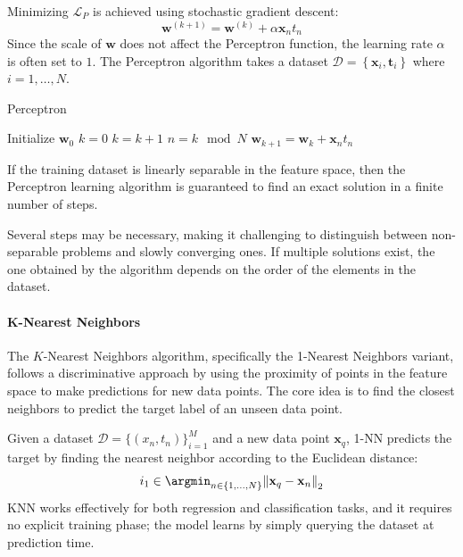 Minimizing $\mathcal{L}_P$ is achieved using stochastic gradient descent:
\[\textbf{w}^{(k+1)}=\textbf{w}^{(k)}+\alpha\textbf{x}_nt_n\]
Since the scale of $\textbf{w}$ does not affect the Perceptron function, the learning rate $\alpha$ is often set to $1$. 
The Perceptron algorithm takes a dataset $\mathcal{D}=\left\{ \textbf{x}_i,\textbf{t}_i  \right\}$ where $i=1,\dots,N$. 
\begin{algorithm}[H]
    \caption{Perceptron}
        \begin{algorithmic}[1]
            \State Initialize $\textbf{w}_0$
            \State $k = 0$
            \Repeat
                \State $k = k+1$
                \State $n = k \mod N$
                    \State $\textbf{w}_{k+1} = \textbf{w}_k + \textbf{x}_nt_n$
                \EndIf
        \end{algorithmic}
\end{algorithm}
\begin{theorem}
    If the training dataset is linearly separable in the feature space, then the Perceptron learning algorithm is guaranteed to find an exact solution in a finite number of steps.
\end{theorem}
Several steps may be necessary, making it challenging to distinguish between non-separable problems and slowly converging ones. 
If multiple solutions exist, the one obtained by the algorithm depends on the order of the elements in the dataset.

\paragraph*{K-Nearest Neighbors}
The $K$-Nearest Neighbors algorithm, specifically the 1-Nearest Neighbors variant, follows a discriminative approach by using the proximity of points in the feature space to make predictions for new data points. 
The core idea is to find the closest neighbors to predict the target label of an unseen data point.

Given a dataset $\mathcal{D}=\{(x_n,t_n)\}_{i=1}^M$ and a new data point $\mathbf{x}_q$, 1-NN predicts the target by finding the nearest neighbor according to the Euclidean distance:
\[i_1\in\argmin_{n\in\{1,\dots,N\}}{\left\lVert \mathbf{x}_q- \mathbf{x}_n\right\rVert}_2 \]
KNN works effectively for both regression and classification tasks, and it requires no explicit training phase; the model learns by simply querying the dataset at prediction time.

